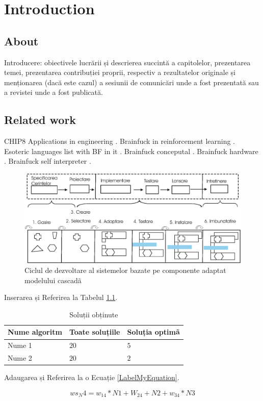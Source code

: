 \chapter{Introduction}
\label{chap:ch1}

\section{About}
\label{chap:ch1sec1}

\par Introducere: obiectivele lucrării și descrierea succintă a capitolelor, prezentarea temei, prezentarea contribuției proprii, respectiv a rezultatelor originale și menționarea (dacă este cazul) a sesiunii de comunicări unde a fost prezentată sau a revistei unde a fost publicată.

\section{Related work}
\label{chap:ch1sec2}

\par CHIP8 Applications in engineering \cite{Chip8Applications2019}.
Brainfuck in reinforcement learning \cite{BFReinforcementLearining2022}.
Esoteric languages list with BF in it \cite{BFEsolang2015}.
Brainfuck conceputal \cite{BFConceptual2017}.
Brainfuck hardware \cite{BFHardware2016}.
Brainfuck self interpreter \cite{BFSelfInterpreter2003}.

\begin{figure}[htbp]
	\centering
		\includegraphics[scale=0.65]{./figures/fig_3_1.eps}
	\caption{Ciclul de dezvoltare al sistemelor bazate pe componente adaptat modelului cascadã}
	\label{FigCBSD}
\end{figure}

Inserarea și Referirea la Tabelul \ref{TabelSolutii}. 

\begin{table}[htbp]
\begin{center}
\begin{tabular}
{|p{120pt}|p{120pt}|p{120pt}|}
\hline
 Nume algoritm  &  Toate soluțiile &  Soluția optimã\\
\hline 
\hline Nume 1 & $20$ & $5$  \\
\hline Nume 2 & $20$ & $2$  \\
\hline
\end{tabular}
\end{center}
\caption{Soluții obținute }
\label{TabelSolutii}
\end{table}


Adaugarea și Referirea la o Ecuație \ref{LabelMyEquation}.


 \begin{equation}
     ws_N4 = w_{14}*N1 + W_{24}+N2 + w_{34}*N3
\label{LabelMyEquation}
 \end{equation}
